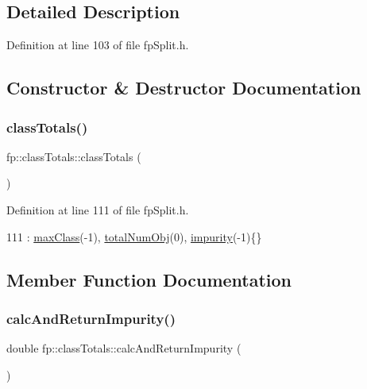 \subsection{Detailed Description}


Definition at line 103 of file fp\+Split.\+h.



\subsection{Constructor \& Destructor Documentation}
\mbox{\label{classfp_1_1classTotals_af1d0b6b91ce2569bf672f1b7d9ce911f}} 
\subsubsection{\texorpdfstring{class\+Totals()}{classTotals()}}
{\footnotesize\ttfamily fp\+::class\+Totals\+::class\+Totals (\begin{DoxyParamCaption}{ }\end{DoxyParamCaption})\hspace{0.3cm}{\ttfamily [inline]}}



Definition at line 111 of file fp\+Split.\+h.


\begin{DoxyCode}
111 : \hyperlink{classfp_1_1classTotals_a83aa8e17bf3b31db3ae19b9ab554624b}{maxClass}(-1), \hyperlink{classfp_1_1classTotals_a97be63e3e4a1b7c553df839034828aae}{totalNumObj}(0), \hyperlink{classfp_1_1classTotals_acd239321a9b15e93e6de272c70b301b3}{impurity}(-1)\{\}
\end{DoxyCode}


\subsection{Member Function Documentation}
\mbox{\label{classfp_1_1classTotals_a94eaf5d719442de6f7014b0630932bb8}} 
\subsubsection{\texorpdfstring{calc\+And\+Return\+Impurity()}{calcAndReturnImpurity()}}
{\footnotesize\ttfamily double fp\+::class\+Totals\+::calc\+And\+Return\+Impurity (\begin{DoxyParamCaption}{ }\end{DoxyParamCaption})\hspace{0.3cm}{\ttfamily [inline]}}




